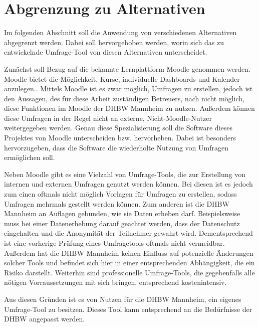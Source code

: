 \section{Abgrenzung zu Alternativen}
\label{sec:AbgrenzungZuAlternativen}

Im folgenden Abschnitt soll die Anwendung von verschiedenen Alternativen abgegrenzt werden.
Dabei soll hervorgehoben werden, worin sich das zu entwickelnde Umfrage-Tool von diesen Alternativen unterscheidet.

Zunächst soll Bezug auf die bekannte Lernplattform Moodle genommen werden.
Moodle bietet die Möglichkeit, Kurse, individuelle Dashboards und Kalender anzulegen.\autocite[Vgl.][]{ms-moodle-features}.
Mittels Moodle ist es zwar möglich, Umfragen zu erstellen, jedoch ist den Aussagen, des für diese Arbeit zuständigen Betreuers, nach nicht möglich, diese Funktionen im Moodle der \acs{DHBW} Mannheim zu nutzen.
Außerdem können diese Umfragen in der Regel nicht an externe, Nicht-Moodle-Nutzer weitergegeben werden.
Genau diese Spezialisierung soll die Software dieses Projektes von Moodle unterscheiden bzw. hervorheben.
Dabei ist besonders hervorzugeben, dass die Software die wiederholte Nutzung von Umfragen ermöglichen soll.

Neben Moodle gibt es eine Vielzahl von Umfrage-Tools, die zur Erstellung von internen und externen Umfragen genutzt werden können.
Bei diesen ist es jedoch zum einen oftmals nicht möglich Vorlagen für Umfragen zu erstellen, sodass Umfragen mehrmals gestellt werden können.
Zum anderen ist die \acs{DHBW} Mannheim an Auflagen gebunden, wie sie Daten erheben darf.
Beispielsweise muss bei einer Datenerhebung darauf geachtet werden, dass der Datenschutz eingehalten und die Anonymität der Teilnehmer gewahrt wird.
Dementsprechend ist eine vorherige Prüfung eines Umfragetools oftmals nicht vermeidbar.
Außerdem hat die \acs{DHBW} Mannheim keinen Einfluss auf potenzielle Änderungen solcher Tools und befindet sich hier in einer entsprechenden Abhängigkeit, die ein Risiko darstellt.
Weiterhin sind professionelle Umfrage-Tools, die gegebenfalls alle nötigen Vorraussetzungen mit sich bringen, entsprechend kostenintensiv.

Aus diesen Gründen ist es von Nutzen für die \acs{DHBW} Mannheim, ein eigenes Umfrage-Tool zu besitzen.
Dieses Tool kann entsprechend an die Bedürfnisse der \acs{DHBW} angepasst werden.
